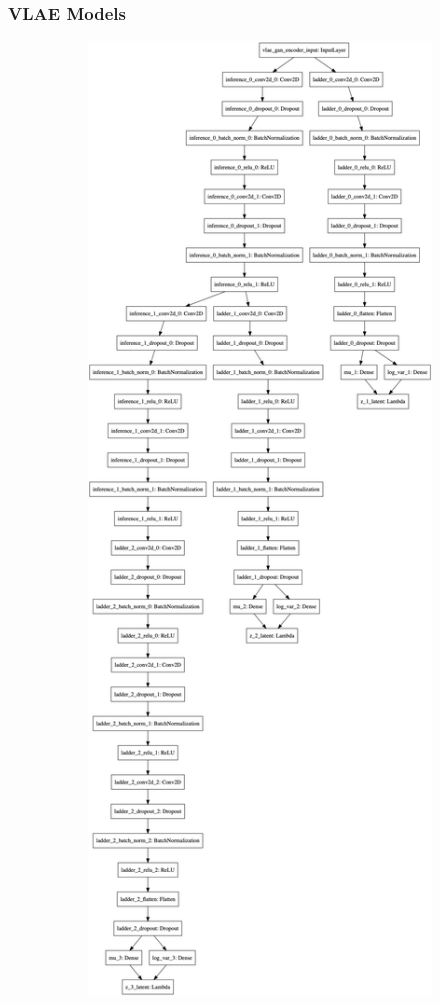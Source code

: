 \subsubsection{VLAE Models}\label{subsubsec:vlae_models}
\begin{figure}
    \centering
    \begin{subfigure}{.5\textwidth}
        \centering
        \includegraphics[width=\textwidth,height=.85\textheight,keepaspectratio]{images/vlae/encoder.png}

\end{subfigure}
\end{figure}
